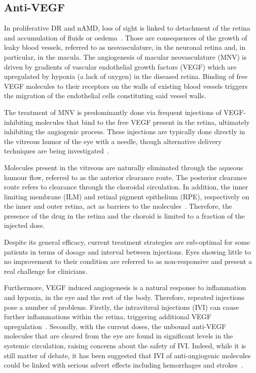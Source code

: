 \documentclass[12pt,a4paper]{journal}
\begin{document}
\subsection*{Anti-VEGF}

In proliferative DR and nAMD, loss of sight is linked to detachment of the retina and accumulation of fluids or oedema~\cite{Roberts_2020, Waldstein_2016}.
Those are consequences of the growth of leaky blood vessels, referred to as neovasculature, in the neuronal retina and, in particular, in the macula.
The angiogenesis of macular neovasculature (MNV) is driven by gradients of vascular endothelial growth factors (VEGF) which are upregulated by hypoxia (a lack of oxygen) in the diseased retina.
Binding of free VEGF molecules to their receptors on the walls of existing blood vessels triggers the migration of the endothelial cells constituting said vessel walls.

The treatment of MNV is predominantly done via frequent injections of VEGF-inhibiting molecules that bind to the free VEGF present in the retina, ultimately inhibiting the angiogenic process.
These injections are typically done directly in the vitreous humor of the eye with a needle, though alternative delivery techniques are being investigated~\cite{Kim_2021}.

Molecules present in the vitreous are naturally eliminated through the aqueous humour flow, referred to as the anterior clearance route.
The posterior clearance route refers to clearance through the choroidal circulation.
In addition, the inner limiting membrane (ILM) and retinal pigment epithelium (RPE), respectively on the inner and outer retina, act as barriers to the molecules~\cite{Park_2015}.
Therefore, the presence of the drug in the retina and the choroid is limited to a fraction of the injected dose. 

Despite its general efficacy, current treatment strategies are sub-optimal for some patients in terms of dosage and interval between injections.
Eyes showing little to no improvement to their condition are referred to as non-responsive and present a real challenge for clinicians.

Furthermore, VEGF induced angiogenesis is a natural response to inflammation and hypoxia, in the eye and the rest of the body. 
Therefore, repeated injections pose a number of problems.
Firstly, the intravitreal injections (IVI) can cause further inflammations within the retina, triggering additional VEGF upregulation~\cite{Iyer_2022}.
Secondly, with the current doses, the unbound anti-VEGF molecules that are cleared from the eye are found in significant levels in the systemic circulation, raising concerns about the safety of IVI.
Indeed, while it is still matter of debate, it has been suggested that IVI of anti-angiogenic molecules could be linked with serious advert effects including hemorrhages and strokes~\cite{Avery_2016, Kaiser_2019, Maloney_2021}.
\end{document}
